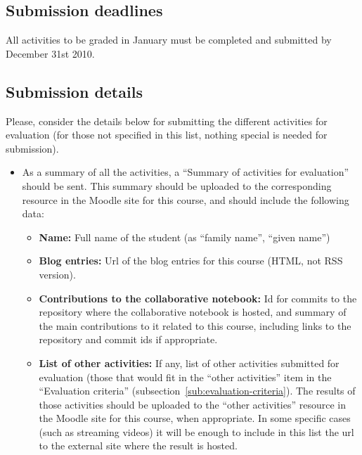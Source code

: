 \documentclass[a4paper]{article}
\begin{document}
\subsection{Submission deadlines}

All activities to be graded in January must be completed and submitted by December 31st 2010.

\subsection{Submission details}

Please, consider the details below for submitting the different activities for evaluation (for those not specified in this list, nothing special is needed for submission).

\begin{itemize}
\item As a summary of all the activities, a ``Summary of activities for evaluation'' should be sent. This summary should be uploaded to the corresponding resource in the Moodle site for this course, and should include the following data:
  \begin{itemize}
  \item \textbf{Name:} Full name of the student (as ``family name'', ``given name'')
  \item \textbf{Blog entries:} Url of the blog entries for this course (HTML, not RSS version).
  \item \textbf{Contributions to the collaborative notebook:} Id for commits to the repository where the collaborative notebook is hosted, and summary of the main contributions to it related to this course, including links to the repository and commit ids if appropriate.
  \item \textbf{List of other activities:} If any, list of other activities submitted for evaluation (those that would fit in the ``other activities'' item in the ``Evaluation criteria'' (subsection~\ref{sub:evaluation-criteria}). The results of those activities should be uploaded to the ``other activities'' resource in the Moodle site for this course, when appropriate. In some specific cases (such as streaming videos) it will be enough to include in this list the url to the external site where the result is hosted.
  \end{itemize}
\end{itemize}

\end{document}
